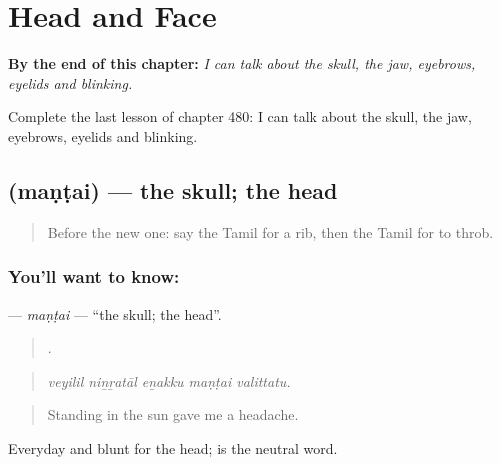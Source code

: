 
\chapter{Head and Face}
\label{ch:ta-head-and-face}

\begin{chapteropening}
\textbf{By the end of this chapter:} \emph{I can talk about the skull, the jaw, eyebrows, eyelids and blinking.}

Complete the last lesson of chapter 480: I can talk about the skull, the jaw, eyebrows, eyelids and blinking.
\end{chapteropening}

\section[\texorpdfstring{\ta{மண்டை} (maṇṭai)}{மண்டை (maṇṭai)}]{ (maṇṭai) — the skull; the head}

\label{lesson:TA-C480-mantai}



\begin{quote}
Before the new one: say the Tamil for a rib, then the Tamil for to throb.
\end{quote}

\subsection*{You'll want to know: }
\textbf{} — \emph{maṇṭai} — \textquotedblleft{}the skull; the head\textquotedblright{}.

\begin{quote}
    .
\end{quote}

\begin{quote}
\emph{veyilil niṉṟatāl eṉakku maṇṭai valittatu.}
\end{quote}

\begin{quote}
Standing in the sun gave me a headache.
\end{quote}

Everyday and blunt for the head;  is the neutral word.

